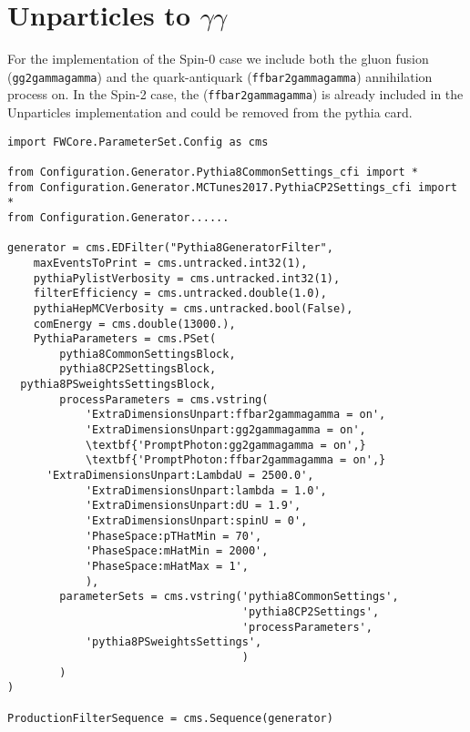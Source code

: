 \section{Unparticles to $\gamma\gamma$}
\begin{spacing}{2}
For the \PYTHIA implementation of the Spin-0 case we include both the gluon fusion (\texttt{gg2gammagamma}) and the quark-antiquark (\texttt{ffbar2gammagamma}) annihilation process on. In the Spin-2 case, the (\texttt{ffbar2gammagamma}) is already included in the Unparticles implementation and could be removed from the pythia card.

\end{spacing}

\begin{singlespace}
\begin{small}
\begin{verbatim}
import FWCore.ParameterSet.Config as cms 

from Configuration.Generator.Pythia8CommonSettings_cfi import *
from Configuration.Generator.MCTunes2017.PythiaCP2Settings_cfi import *
from Configuration.Generator......

generator = cms.EDFilter("Pythia8GeneratorFilter",
    maxEventsToPrint = cms.untracked.int32(1),
    pythiaPylistVerbosity = cms.untracked.int32(1),
    filterEfficiency = cms.untracked.double(1.0),
    pythiaHepMCVerbosity = cms.untracked.bool(False),
    comEnergy = cms.double(13000.),
    PythiaParameters = cms.PSet(
        pythia8CommonSettingsBlock,
        pythia8CP2SettingsBlock,
  pythia8PSweightsSettingsBlock,
        processParameters = cms.vstring(
            'ExtraDimensionsUnpart:ffbar2gammagamma = on',
            'ExtraDimensionsUnpart:gg2gammagamma = on',
            \textbf{'PromptPhoton:gg2gammagamma = on',}
            \textbf{'PromptPhoton:ffbar2gammagamma = on',}
      'ExtraDimensionsUnpart:LambdaU = 2500.0',
            'ExtraDimensionsUnpart:lambda = 1.0',
            'ExtraDimensionsUnpart:dU = 1.9',
            'ExtraDimensionsUnpart:spinU = 0',
            'PhaseSpace:pTHatMin = 70',
            'PhaseSpace:mHatMin = 2000',
            'PhaseSpace:mHatMax = 1',
            ),  
        parameterSets = cms.vstring('pythia8CommonSettings',
                                    'pythia8CP2Settings',
                                    'processParameters',
            'pythia8PSweightsSettings',
                                    )   
        )   
)

ProductionFilterSequence = cms.Sequence(generator)
\end{verbatim}
\end{small}
\end{singlespace}


